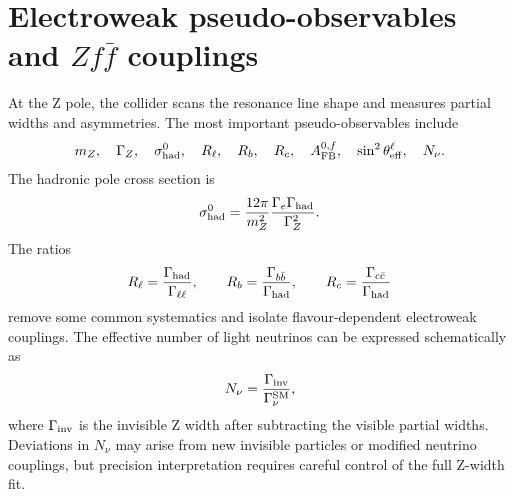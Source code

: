 \documentclass[11pt,a4paper]{report}
\begin{document}
\section{Electroweak pseudo-observables and $Zf\bar f$ couplings}
At the Z pole, the collider scans the resonance line shape and measures partial widths and asymmetries.  The most important pseudo-observables include
\begin{equation}
  m_Z,\quad \Gamma_Z,\quad \sigma^0_{\rm had},\quad R_\ell,\quad R_b,\quad R_c,
  \quad A_{\rm FB}^{0,f},\quad \sin^2\theta_{\rm eff}^\ell,\quad N_\nu.
\end{equation}
The hadronic pole cross section is
\begin{equation}
  \sigma^0_{\rm had}=\frac{12\pi}{m_Z^2}\frac{\Gamma_e\Gamma_{\rm had}}{\Gamma_Z^2}.
\end{equation}
The ratios
\begin{equation}
  R_\ell=\frac{\Gamma_{\rm had}}{\Gamma_{\ell\ell}},\qquad
  R_b=\frac{\Gamma_{b\bar b}}{\Gamma_{\rm had}},\qquad
  R_c=\frac{\Gamma_{c\bar c}}{\Gamma_{\rm had}}
\end{equation}
remove some common systematics and isolate flavour-dependent electroweak couplings.  The effective number of light neutrinos can be expressed schematically as
\begin{equation}
  N_\nu=\frac{\Gamma_{\rm inv}}{\Gamma_{\nu}^{\rm SM}},
\end{equation}
where $\Gamma_{\rm inv}$ is the invisible Z width after subtracting the visible partial widths.  Deviations in $N_\nu$ may arise from new invisible particles or modified neutrino couplings, but precision interpretation requires careful control of the full Z-width fit.
\end{document}
